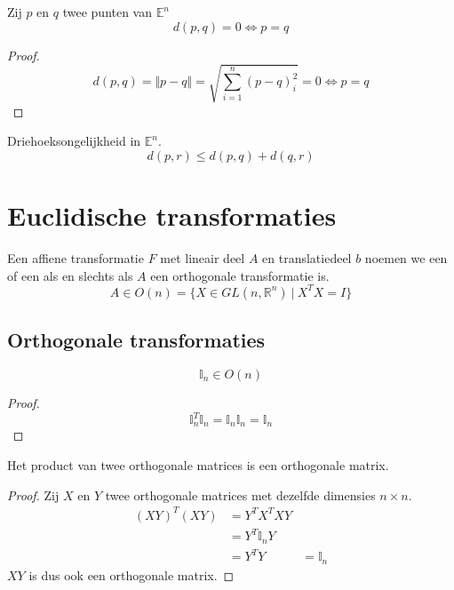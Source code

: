 \documentclass[main.tex]{subfiles}
\begin{document}
\begin{ei}
  \label{ei:afstand-nul-gelijk}
  Zij $p$ en $q$ twee punten van $\mathbb{E}^{n}$
  \[ d(p,q) = 0 \Leftrightarrow p = q \]

  \begin{proof}
    \[ d(p,q) = \Vert p-q \Vert = \sqrt{\sum_{i=1}^{n}(p-q)^{2}_{i}} = 0 \Leftrightarrow p = q \]
  \end{proof}
\end{ei}

\begin{ei}
  \label{ei:driehoeksongelijkheid-in-En}
  Driehoeksongelijkheid in $\mathbb{E}^{n}$.
  \[ d(p,r) \le d(p,q) + d(q,r) \]
\end{ei}

\section{Euclidische transformaties}
\label{sec:eucl-transf}

\begin{de}
  \label{de:euclidische-transformatie}
  Een affiene transformatie $F$ met lineair deel $A$ en translatiedeel $b$ noemen we een  of een  als en slechts als $A$ een orthogonale transformatie is.
  \[ A \in O(n) = \{ X \in GL(n,\mathbb{R}^{n}) \ |\ X^{T}X = I \} \]
\end{de}

\subsection{Orthogonale transformaties}
\label{sec:orth-transf}

\begin{st}
  \label{st:i-orthogonaal}
  \[ \mathbb{I}_{n} \in O(n) \] 

  \begin{proof}
    \[ \mathbb{I}_{n}^{T}\mathbb{I}_{n} = \mathbb{I}_{n}\mathbb{I}_{n} = \mathbb{I}_{n} \]
  \end{proof}
\end{st}

\begin{st}
  \label{st:product-orthogonale-matrices-orthogonaal}
  Het product van twee orthogonale matrices is een orthogonale matrix.

  \begin{proof}
    Zij $X$ en $Y$ twee orthogonale matrices met dezelfde dimensies $n \times n$.
    \[
    \begin{array}{rll}
      (XY)^{T}(XY) &= Y^{T}X^{T}XY &\\
                  &= Y^{T}\mathbb{I}_{n}Y &\\
                  &= Y^{T}Y &= \mathbb{I}_{n}
    \end{array}
    \]
    $XY$ is dus ook een orthogonale matrix.
  \end{proof}
\end{st}
\end{document}
